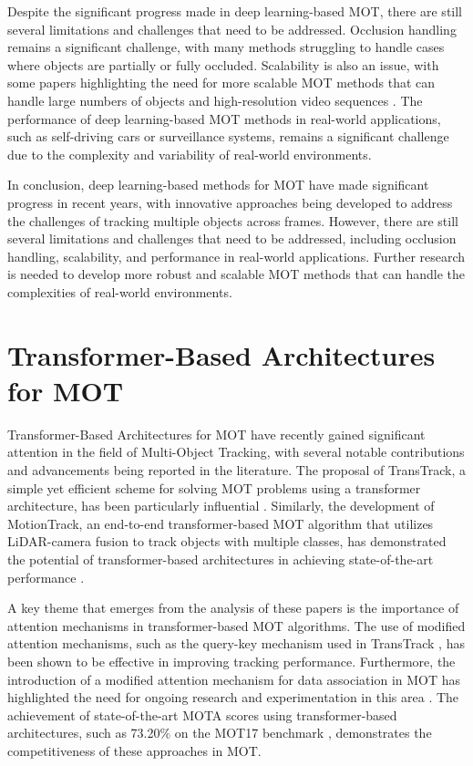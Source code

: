 \documentclass[conference]{IEEEtran}
\begin{document}
Despite the significant progress made in deep learning-based MOT, there are still several limitations and challenges that need to be addressed. Occlusion handling remains a significant challenge, with many methods struggling to handle cases where objects are partially or fully occluded. Scalability is also an issue, with some papers highlighting the need for more scalable MOT methods that can handle large numbers of objects and high-resolution video sequences \cite{Multiple Object Tracking in Recent Times: A Literature Review}. The performance of deep learning-based MOT methods in real-world applications, such as self-driving cars or surveillance systems, remains a significant challenge due to the complexity and variability of real-world environments.

In conclusion, deep learning-based methods for MOT have made significant progress in recent years, with innovative approaches being developed to address the challenges of tracking multiple objects across frames. However, there are still several limitations and challenges that need to be addressed, including occlusion handling, scalability, and performance in real-world applications. Further research is needed to develop more robust and scalable MOT methods that can handle the complexities of real-world environments.

\section{Transformer-Based Architectures for MOT}
Transformer-Based Architectures for MOT have recently gained significant attention in the field of Multi-Object Tracking, with several notable contributions and advancements being reported in the literature. The proposal of TransTrack, a simple yet efficient scheme for solving MOT problems using a transformer architecture, has been particularly influential \cite{TransTrack}. Similarly, the development of MotionTrack, an end-to-end transformer-based MOT algorithm that utilizes LiDAR-camera fusion to track objects with multiple classes, has demonstrated the potential of transformer-based architectures in achieving state-of-the-art performance \cite{MotionTrack}.

A key theme that emerges from the analysis of these papers is the importance of attention mechanisms in transformer-based MOT algorithms. The use of modified attention mechanisms, such as the query-key mechanism used in TransTrack \cite{TransTrack}, has been shown to be effective in improving tracking performance. Furthermore, the introduction of a modified attention mechanism for data association in MOT has highlighted the need for ongoing research and experimentation in this area \cite{ModifiedAttention}. The achievement of state-of-the-art MOTA scores using transformer-based architectures, such as 73.20\% on the MOT17 benchmark \cite{MOT17}, demonstrates the competitiveness of these approaches in MOT.
\end{document}
